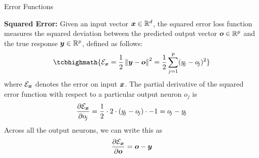 \begin{frame}{Error Functions}
%

    {\bf Squared Error:} Given an input vector ${\boldsymbol x} \in {\mathord{\mathbb R}}^d$,
        the squared error loss function measures the squared deviation
        between the predicted output vector ${\boldsymbol o} \in {\mathord{\mathbb R}}^p$ and the
        true response ${\boldsymbol y} \in {\mathord{\mathbb R}}^p$, defined as follows: 
    \begin{align}
        \tcbhighmath{
    \cE_\bx = \frac{1}{2} \norm{\by - \bo}^2 
= \frac{1}{2} \sum_{j=1}^p (y_{\!j} - o_{\!j})^2}
    \label{eq:reg:neural:SSE}
\end{align}
where ${\mathcal E}_{\boldsymbol x}$ denotes the error on input ${\boldsymbol x}$.
%        
        The partial derivative of the squared error function with
        respect to a particular output neuron $o_{\!j}$ is
        \begin{align}
            \frac{\partial {\mathcal E}_{\boldsymbol x}}{\partial o_{\!j}} = 
            \frac{1}{2} \cdot 2 \cdot (y_{\!j} - o_{\!j}) \cdot -1 = 
            o_{\!j} -
            y_{\!j}
        \label{eq:reg:neural:deriv_SE_single}
        \end{align}
        Across all the output neurons, we can write this as
        \begin{align}
            \frac{\partial{\mathcal E}_{\boldsymbol x}}{\partial {\boldsymbol o}} = {\boldsymbol o} - {\boldsymbol y}
        \label{eq:reg:neural:deriv_SE}
        \end{align}
%
\end{frame}

